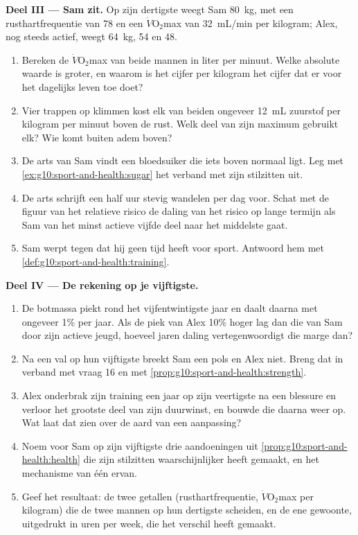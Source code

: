 \begin{problem}
\medskip
\noindent\textbf{Deel III --- Sam zit.}
Op zijn dertigste weegt Sam \qty{80}{kg}, met een rusthartfrequentie van
78 en een $\dot V\!\mathrm{O_2}$max van \qty{32}{mL/min} per kilogram;
Alex, nog steeds actief, weegt \qty{64}{kg}, 54 en \num{48}.
\begin{enumerate}[resume]
  \item Bereken de $\dot V\!\mathrm{O_2}$max van beide mannen in liter
        per minuut. Welke absolute waarde is groter, en waarom is het
        cijfer per kilogram het cijfer dat er voor het dagelijks leven
        toe doet?
  \item Vier trappen op klimmen kost elk van beiden ongeveer
        \qty{12}{mL} zuurstof per kilogram per minuut boven de rust. Welk
        deel van zijn maximum gebruikt elk? Wie komt buiten adem boven?
  \item De arts van Sam vindt een bloedsuiker die iets boven normaal
        ligt. Leg met \cref{ex:g10:sport-and-health:sugar} het verband
        met zijn stilzitten uit.
  \item De arts schrijft een half uur stevig wandelen per dag voor. Schat
        met de figuur van het relatieve risico de daling van het risico
        op lange termijn als Sam van het minst actieve vijfde deel naar
        het middelste gaat.
  \item Sam werpt tegen dat hij geen tijd heeft voor sport. Antwoord hem
        met \cref{def:g10:sport-and-health:training}.
\end{enumerate}

\medskip
\noindent\textbf{Deel IV --- De rekening op je vijftigste.}
\begin{enumerate}[resume]
  \item De botmassa piekt rond het vijfentwintigste jaar en daalt daarna
        met ongeveer 1\% per jaar. Als de piek van Alex 10\% hoger lag
        dan die van Sam door zijn actieve jeugd, hoeveel jaren daling
        vertegenwoordigt die marge dan?
  \item Na een val op hun vijftigste breekt Sam een pols en Alex niet.
        Breng dat in verband met vraag 16 en met
        \cref{prop:g10:sport-and-health:strength}.
  \item Alex onderbrak zijn training een jaar op zijn veertigste na een
        blessure en verloor het grootste deel van zijn duurwinst, en
        bouwde die daarna weer op. Wat laat dat zien over de aard van een
        aanpassing?
  \item Noem voor Sam op zijn vijftigste drie aandoeningen uit
        \cref{prop:g10:sport-and-health:health} die zijn stilzitten
        waarschijnlijker heeft gemaakt, en het mechanisme van één ervan.
  \item Geef het resultaat: de twee getallen (rusthartfrequentie,
        $\dot V\!\mathrm{O_2}$max per kilogram) die de twee mannen op hun
        dertigste scheiden, en de ene gewoonte, uitgedrukt in uren per
        week, die het verschil heeft gemaakt.
\end{enumerate}
\end{problem}
